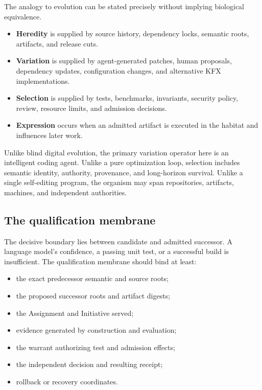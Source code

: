 The analogy to evolution can be stated precisely without implying biological
equivalence.

\begin{itemize}[leftmargin=*]
  \item \textbf{Heredity} is supplied by source history, dependency locks,
  semantic roots, artifacts, and release cuts.
  \item \textbf{Variation} is supplied by agent-generated patches, human
  proposals, dependency updates, configuration changes, and alternative KFX
  implementations.
  \item \textbf{Selection} is supplied by tests, benchmarks, invariants,
  security policy, review, resource limits, and admission decisions.
  \item \textbf{Expression} occurs when an admitted artifact is executed in
  the habitat and influences later work.
\end{itemize}

Unlike blind digital evolution, the primary variation operator here is an
intelligent coding agent. Unlike a pure optimization loop, selection includes
semantic identity, authority, provenance, and long-horizon survival. Unlike a
single self-editing program, the organism may span repositories, artifacts,
machines, and independent authorities.

\subsection{The qualification membrane}

The decisive boundary lies between candidate and admitted successor. A
language model's confidence, a passing unit test, or a successful build is
insufficient. The qualification membrane should bind at least:

\begin{itemize}[leftmargin=*]
  \item the exact predecessor semantic and source roots;
  \item the proposed successor roots and artifact digests;
  \item the Assignment and Initiative served;
  \item evidence generated by construction and evaluation;
  \item the warrant authorizing test and admission effects;
  \item the independent decision and resulting receipt;
  \item rollback or recovery coordinates.
\end{itemize}

